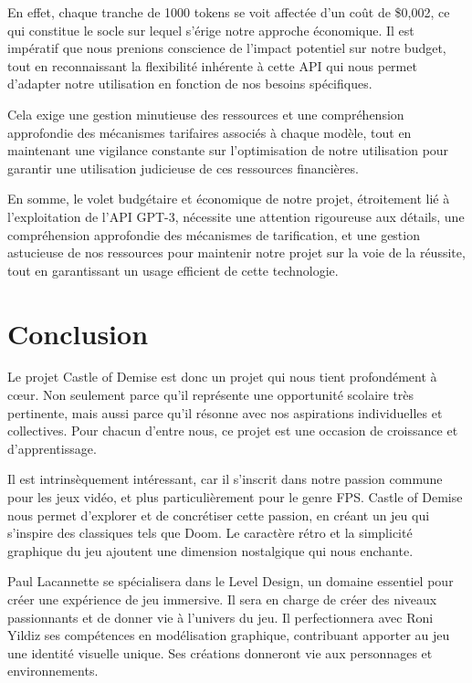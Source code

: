 \documentclass{report}
\begin{document}
En effet, chaque tranche de 1000 tokens se voit affectée d’un coût
de \$0,002, ce qui constitue le socle sur lequel s’érige notre approche économique.
Il est impératif que nous prenions conscience de l’impact potentiel sur notre
budget, tout en reconnaissant la flexibilité inhérente à cette API qui nous permet d’adapter
notre utilisation en fonction de nos besoins spécifiques. \newline

Cela exige une gestion minutieuse des ressources et une compréhension approfondie des mécanismes tarifaires associés à chaque modèle, tout en maintenant une vigilance constante sur l’optimisation de notre utilisation pour garantir une utilisation judicieuse de ces ressources financières. \newline

En somme, le volet budgétaire et économique de notre projet, étroitement lié à l’exploitation de l’API GPT-3, nécessite une attention rigoureuse aux détails, une compréhension approfondie des mécanismes de tarification, et une gestion astucieuse de nos ressources pour maintenir notre projet sur la voie de la réussite, tout en garantissant un usage efficient de cette technologie.

\newpage

\section{Conclusion}
Le projet Castle of Demise est donc un projet qui nous tient profondément à cœur. Non seulement parce qu’il représente une opportunité scolaire très pertinente, mais aussi parce qu’il résonne avec nos aspirations individuelles et collectives. Pour chacun d’entre nous, ce projet est une occasion de croissance et d’apprentissage. \newline

Il est intrinsèquement intéressant, car il s’inscrit dans notre passion commune pour les jeux vidéo, et plus particulièrement pour le genre FPS. Castle of Demise nous permet d’explorer et de concrétiser cette passion, en créant un jeu qui s’inspire des classiques tels que Doom. Le caractère rétro et la simplicité graphique du jeu ajoutent une dimension nostalgique qui nous enchante. \newline

Paul Lacannette se spécialisera dans le Level Design, un domaine essentiel pour créer une expérience de jeu immersive. Il sera en charge de créer des niveaux passionnants et de donner vie à l’univers du jeu. Il perfectionnera avec Roni Yildiz ses compétences en modélisation graphique, contribuant apporter au jeu une identité visuelle unique. Ses créations donneront vie aux personnages et environnements. \newline
\end{document}
